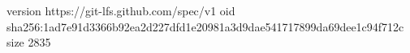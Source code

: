 version https://git-lfs.github.com/spec/v1
oid sha256:1ad7e91d3366b92ea2d227dfd1e20981a3d9dae541717899da69dee1c94f712c
size 2835
